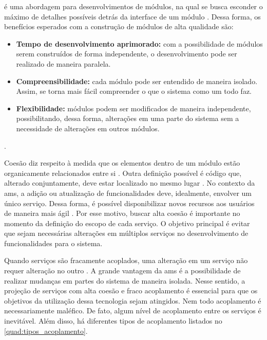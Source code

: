  é uma abordagem para desenvolvimentos de módulos, na qual se busca esconder o máximo de detalhes possíveis detrás da interface de um módulo \cite{buildingMicroservices}. Dessa forma, os benefícios esperados com a construção de módulos de alta qualidade são:
\begin{itemize}
    \item \textbf{Tempo de desenvolvimento aprimorado:} com a possibilidade de módulos serem construídos de forma independente, o desenvolvimento pode ser realizado de maneira paralela.
    \item \textbf{Compreensibilidade:} cada módulo pode ser entendido de maneira isolado. Assim, se torna mais fácil compreender o que o sistema como um todo faz.
    \item \textbf{Flexibilidade:} módulos podem ser modificados de maneira independente, possibilitando, dessa forma, alterações em uma parte do sistema sem a necessidade de alterações em outros módulos.
\end{itemize}
\cite{Parnas2012}.

Coesão diz respeito à medida que os elementos dentro de um módulo estão organicamente relacionados entre si \cite{Yourdon1979}. Outra definição possível é código que, alterado conjuntamente, deve estar localizado no mesmo lugar \cite{buildingMicroservices}. No contexto da \acrshort{ams}, a adição ou atualização de funcionalidades deve, idealmente, envolver um único serviço. Dessa forma, é possível disponibilizar novos recursos aos usuários de maneira mais ágil \cite{buildingMicroservices}. Por esse motivo, buscar alta coesão é importante no momento da definição do escopo de cada serviço. O objetivo principal é evitar que sejam necessárias alterações em múltiplos serviços no desenvolvimento de funcionalidades para o sistema.

Quando serviços são fracamente acoplados, uma alteração em um serviço não requer alteração no outro \cite{buildingMicroservices}. A grande vantagem da \acrshort{ams} é a possibilidade de realizar mudanças em partes do sistema de maneira isolada. Nesse sentido, a projeção de serviços com alta coesão e fraco acoplamento é essencial para que os objetivos da utilização dessa tecnologia sejam atingidos. Nem todo acoplamento é necessariamente maléfico. De fato, algum nível de acoplamento entre os serviços é inevitável. Além disso, há diferentes tipos de acoplamento listados no \autoref{quad:tipos_acoplamento}.

